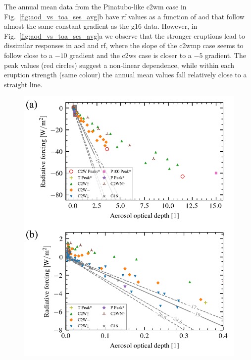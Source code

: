 \documentclass{ametsocV6.1}
\begin{document}
The annual mean data from the Pinatubo-like \gls{c2wm} case in
Fig.~\ref{fig:aod_vs_toa_ses_avg}b have \gls{rf} values as a function of \gls{aod} that
follow almost the same constant gradient as the \gls{g16} data. However, in
Fig.~\ref{fig:aod_vs_toa_ses_avg}a we observe that the stronger eruptions lead to
dissimilar responses in \gls{aod} and \gls{rf}, where the slope of the \gls{c2wmp} case
seems to follow close to a \(-10\) gradient and the \gls{c2ws} case is closer to a
\(-5\) gradient. The peak values (red circles) suggest a non-linear dependence, while
within each eruption strength (same colour) the annual mean values fall relatively close
to a straight line.

\begin{figure}
  \centering
  \includegraphics{figures/figure2.png}


\end{figure}
\end{document}
